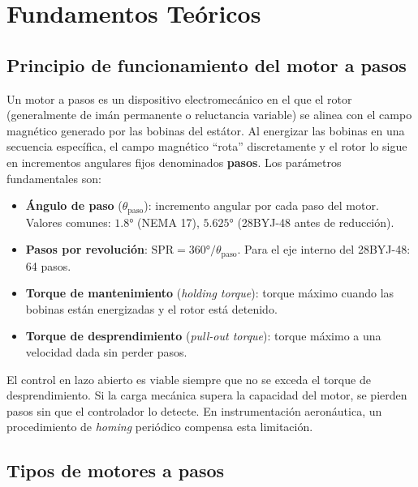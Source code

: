 \documentclass[11pt]{article}
\begin{document}
\section{Fundamentos Teóricos}

\subsection{Principio de funcionamiento del motor a pasos}
Un motor a pasos es un dispositivo electromecánico en el que el rotor (generalmente de
imán permanente o reluctancia variable) se alinea con el campo magnético generado por las
bobinas del estátor. Al energizar las bobinas en una secuencia específica, el campo
magnético ``rota'' discretamente y el rotor lo sigue en incrementos angulares fijos
denominados \textbf{pasos}. Los parámetros fundamentales son:
\begin{itemize}
  \item \textbf{Ángulo de paso} ($\theta_\text{paso}$): incremento angular por cada paso
        del motor. Valores comunes: $1.8\si{\degree}$ (NEMA 17), $5.625\si{\degree}$
        (28BYJ-48 antes de reducción).
  \item \textbf{Pasos por revolución}: $\text{SPR}=360\si{\degree}/\theta_\text{paso}$.
        Para el eje interno del 28BYJ-48: 64 pasos.
  \item \textbf{Torque de mantenimiento} (\emph{holding torque}): torque máximo cuando
        las bobinas están energizadas y el rotor está detenido.
  \item \textbf{Torque de desprendimiento} (\emph{pull-out torque}): torque máximo a una
        velocidad dada sin perder pasos.
\end{itemize}

\begin{nota}
El control en lazo abierto es viable siempre que no se exceda el torque de
desprendimiento. Si la carga mecánica supera la capacidad del motor, se pierden pasos sin
que el controlador lo detecte. En instrumentación aeronáutica, un procedimiento de
\emph{homing} periódico compensa esta limitación.
\end{nota}

\subsection{Tipos de motores a pasos}
\end{document}
